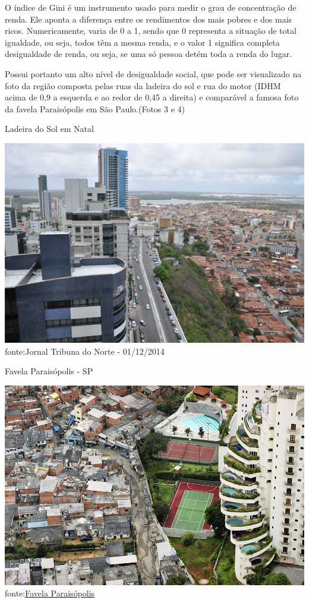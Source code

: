 \documentclass[
	12pt,				%
	openright,			%
	twoside,			%
	a4paper,			%
	chapter=TITLE,		%
	section=TITLE,		%
	subsection=TITLE,	%
	subsubsection=TITLE,%
	spanish,            %
	english,			%
	brazil				%
	]{abntex2}
\begin{document}
\par
O índice de Gini é um instrumento usado para medir o grau de concentração de renda. Ele aponta a diferença entre os rendimentos dos mais pobres e dos	mais ricos. Numericamente, varia de 0 a 1, sendo que 0 representa a situação de total igualdade, ou seja,	todos têm a mesma renda, e o valor 1 significa completa desigualdade de renda, ou seja, se uma só pessoa detém toda a renda do lugar.
\par
Possui portanto um alto nível de desigualdade social, que pode ser visualizado
na foto da região composta pelas ruas da ladeira do sol e rua do motor (IDHM acima de 0,9 a esquerda e ao redor de 0,45 a direita) e comparável a famosa foto da favela Paraisópolis em São Paulo.(Fotos 3 e 4)
\begin{foto}[!htpb]
	\centering
	\begin{minipage}{.47\linewidth}
		\caption{\label{Foto1}Ladeira do Sol em Natal}	
		\includegraphics[width=\linewidth]{Natal_paraisopolis.jpg}
		\ABNTEXchapterfont\small{fonte:Jornal Tribuna do Norte - 01/12/2014}
	\end{minipage}
	\hspace{.05\linewidth}
	\begin{minipage}{.46\linewidth}
		\caption{\label{Foto2}Favela Paraisópolis - SP}
		\includegraphics[width=\linewidth]{Paraisopolis.jpg}
		\ABNTEXchapterfont\small{fonte:\href{http://www.tucavieira.com.br/A-foto-da-favela-de-Paraisopolis}{Favela Paraisópolis}}
	\end{minipage}
\end{foto}
\end{document}

